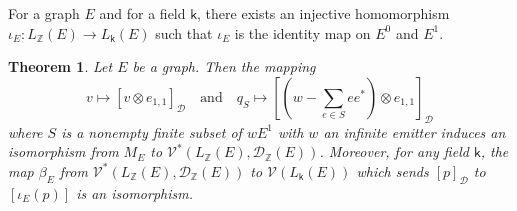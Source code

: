 \documentclass[11pt, letterpaper,final]{amsart}
\newcommand{\ZZ}{\mathbb{Z}}
\newcommand{\V}{\mathcal{V}}
\newcommand{\D}{\mathcal{D}}
\newtheorem{thm}{Theorem}[section]
\theoremstyle{definition}
\theoremstyle{remark}
\begin{document}
For a graph $E$ and for a field $\mathsf{k}$, there exists an injective homomorphism $\iota_E \colon L_\ZZ(E) \to L_\mathsf{k}(E)$ such that $\iota_E$ is the identity map on $E^0$ and $E^1$.


\begin{thm}\label{thm:monoid}
Let $E$ be a graph.  Then the mapping
$$v \mapsto [v \otimes e_{1,1}]_{\D} \quad \text{and} \quad q_S \mapsto \left[ \left(w - \sum_{ e\in S} e e^*\right) \otimes e_{1,1}\right]_{\D}$$ 
where $S$ is a nonempty finite subset of $wE^1$ with $w$ an infinite emitter induces an isomorphism from $M_E$ to $\V^*(L_\ZZ(E), \D_\ZZ(E))$.  Moreover, for any field $\mathsf{k}$, the map $\beta_E$ from $\V^*(L_\ZZ(E), \D_\ZZ(E))$ to $\V(L_\mathsf{k}(E))$ which sends $[p]_\D$ to $[\iota_E(p)]$ is an isomorphism. 
\end{thm}
\end{document}
